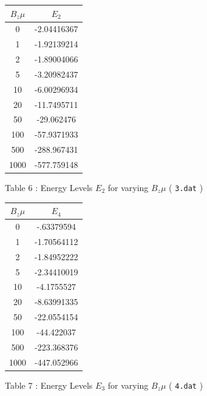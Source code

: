 \documentclass[a4paper]{IEEEtran}
\begin{document}
    \begin{table} 
         \begin{center}
        \begin{tabular}{|c|c|} \hline
        $B_z\mu$ & $E_2$ \\ \hline \hline
        0    & -2.04416367 \\ \hline
        1    & -1.92139214\\ \hline
        2    & -1.89004066 \\ \hline
        5    & -3.20982437 \\ \hline
        10   & -6.00296934 \\ \hline
        20   & -11.7495711\\ \hline
        50   & -29.062476 \\ \hline
        100  & -57.9371933  \\ \hline
        500  & -288.967431  \\ \hline
        1000 & -577.759148 \\ \hline
        \end{tabular}
         \vspace{1mm}
        \begin{center}
            Table 6 : Energy Levels $E_2$ for varying $B_z\mu$ ( \texttt{3.dat} )
        \end{center}
        \end{center}
    \end{table} 

    \begin{table} 
         \begin{center}
        \begin{tabular}{|c|c|}  \hline
        $B_z\mu$ & $E_4$  \\ \hline \hline
        0    & -.63379594 \\ \hline
        1    &  -1.70564112 \\ \hline
        2    &  -1.84952222\\ \hline
        5    &  -2.34410019 \\ \hline
        10   &  -4.1755527 \\ \hline
        20   &  -8.63991335 \\ \hline
        50   &  -22.0554154 \\ \hline
        100  &  -44.422037 \\ \hline
        500  &  -223.368376 \\ \hline
        1000 &  -447.052966 \\ \hline
        \end{tabular}
         \vspace{1mm}
        \begin{center}
            Table 7 : Energy Levels $E_3$ for varying $B_z\mu$ ( \texttt{4.dat} )
        \end{center}
        \end{center}
    \end{table} 
\end{document}
